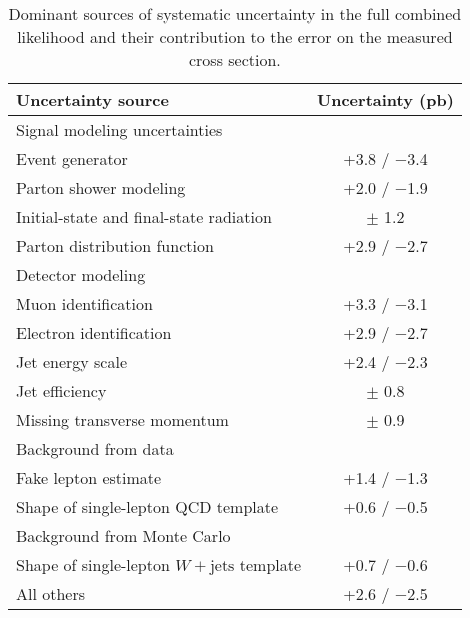 
\begin{table}[htbp]
  \begin{center}
    \begin{tabular}{|l|c|} \hline
      Uncertainty source & Uncertainty (pb) \\
      \hline
      \hline
      Signal modeling uncertainties & \\
      \hline
      Event generator & +3.8 / $-$3.4 \\
      Parton shower modeling &  +2.0 / $-$1.9 \\
      Initial-state and final-state radiation & $\pm$ 1.2 \\ %
      Parton distribution function & +2.9 / $-$2.7 \\
      \hline
      \hline
      Detector modeling & \\
      \hline
      Muon identification & +3.3 / $-$3.1 \\      
      Electron identification &  +2.9 / $-$2.7 \\
      Jet energy scale &  +2.4 / $-$2.3 \\
      Jet efficiency &  $\pm$ 0.8 \\ %
      Missing transverse momentum & $\pm$ 0.9 \\%
      \hline
      \hline
      Background from data & \\
      \hline
      Fake lepton estimate &  +1.4 / $-$1.3 \\
      Shape of single-lepton QCD template &  +0.6 / $-$0.5 \\
      \hline
      \hline
      Background from Monte Carlo & \\
      \hline
      Shape of single-lepton $W + \text{jets}$ template &  +0.7 / $-$0.6 \\
      \hline
      \hline
      All others & +2.6 / $-$2.5 \\
      \hline
    \end{tabular}
  \end{center}
  \caption{\label{tab:importantSystematics}
    Dominant sources of systematic uncertainty in the full combined likelihood 
    and their contribution to the error on the measured cross section.
  }
\end{table}

